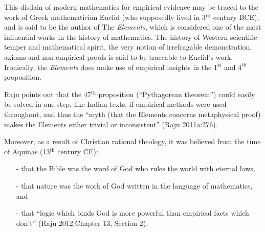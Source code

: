 This disdain of modern mathematics for empirical evidence may be traced to the work of Greek mathematician Euclid (who supposedly lived in 3$^{\text{rd}}$ century BCE), and is said to be the author of The {\sl Elements}, which is considered one of the most influential works in the history of mathematics. The history of Western scientific temper and mathematical spirit, the very notion of irrefragable demonstration, axioms and non-empirical proofs is said to be traceable to Euclid’s work. Ironically, the {\sl Elements} does make use of empirical insights in the  1$^{\text{st}}$ and $4^{\text{th}}$ proposition.

Raju points out that the 47$^{\text{th}}$ proposition (``Pythagorean theorem'') could easily be solved in one step, like Indian texts, if empirical methods were used throughout, and thus the ``myth (that the Elements concerns metaphysical proof) makes the Elements either trivial or inconsistent'' (Raju 2011a:276).

Moreover, as a result of Christian rational theology, it was believed from the time of Aquinas (13$^{\text{th}}$ century CE): 
\begin{itemize}
\item[-] that the Bible was the word of God who rules the world with eternal laws,
\item[-] that nature was the work of God written in the language of mathematics, and 
\item[-] that ``logic which binds God is more powerful than empirical facts which don’t'' (Raju 2012:Chapter 13, Section 2). 
\end{itemize}

